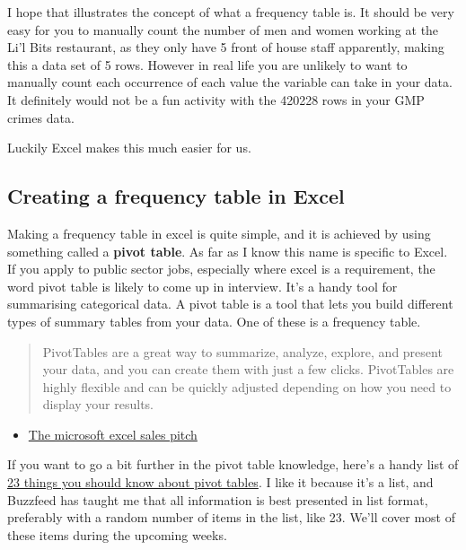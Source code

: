 \documentclass[
]{book}
\providecommand{\tightlist}{%
  \setlength{\itemsep}{0pt}\setlength{\parskip}{0pt}}
\begin{document}
I hope that illustrates the concept of what a frequency table is. It should be very easy for you to manually count the number of men and women working at the Li'l Bits restaurant, as they only have 5 front of house staff apparently, making this a data set of 5 rows. However in real life you are unlikely to want to manually count each occurrence of each value the variable can take in your data. It definitely would not be a fun activity with the 420228 rows in your GMP crimes data.

Luckily Excel makes this much easier for us.

\hypertarget{creating-a-frequency-table-in-excel}{%
\subsection{Creating a frequency table in Excel}\label{creating-a-frequency-table-in-excel}}

Making a frequency table in excel is quite simple, and it is achieved by using something called a \textbf{pivot table}. As far as I know this name is specific to Excel. If you apply to public sector jobs, especially where excel is a requirement, the word pivot table is likely to come up in interview. It's a handy tool for summarising categorical data. A pivot table is a tool that lets you build different types of summary tables from your data. One of these is a frequency table.

\begin{quote}
PivotTables are a great way to summarize, analyze, explore, and present your data, and you can create them with just a few clicks. PivotTables are highly flexible and can be quickly adjusted depending on how you need to display your results.
\end{quote}

\begin{itemize}
\tightlist
\item
  \href{https://support.office.com/en-gb/article/Create-a-PivotTable-to-analyze-worksheet-data-a9a84538-bfe9-40a9-a8e9-f99134456576}{The microsoft excel sales pitch}
\end{itemize}

If you want to go a bit further in the pivot table knowledge, here's a handy list of \href{https://exceljet.net/things-to-know-about-excel-pivot-tables}{23 things you should know about pivot tables}. I like it because it's a list, and Buzzfeed has taught me that all information is best presented in list format, preferably with a random number of items in the list, like 23. We'll cover most of these items during the upcoming weeks.
\end{document}
